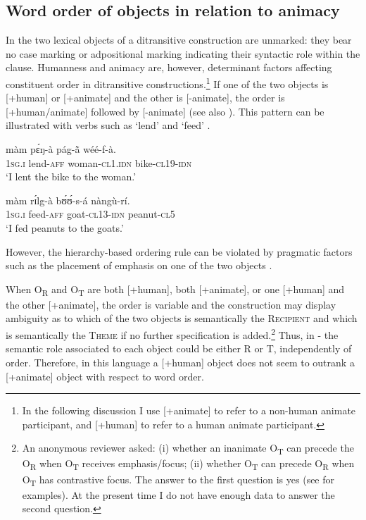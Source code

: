 \documentclass[output=paper]{langsci/langscibook}
\begin{document}
\subsection{Word order of objects in relation to animacy}\label{§4.2:word.pacchiarotti}

In  the two lexical objects of a ditransitive construction are unmarked: they bear no case marking or adpositional marking indicating their syntactic role within the clause. Humanness and animacy are, however, determinant factors affecting constituent order in ditransitive constructions.\footnote{In the following discussion I use [+animate] to refer to a non-human animate participant, and [+human] to refer to a human animate participant.} If one of the two objects is [+human] or [+animate] and the other is [-animate], the order is [+human/animate] followed by [-animate] (see also \citealt[394]{canu1974}). This pattern can be illustrated with verbs such as `lend'  and `feed' .

\ea
\label{ex:14.pacchiarotti}
\gll màm    pɛ́ŋ-à         pág-\`{ã}      wéé-f-à.\\
\textsc{1sg.i}    lend-\textsc{aff}        woman-\textsc{cl1.idn}  bike-\textsc{cl19-idn}\\
\glt `I lent the bike to the woman.'
\z

\ea
\label{ex:15.pacchiarotti}
\gll màm    rɪ́lg-à      bʊ́ʊ́-s-á    nàngù-rí. \\
\textsc{1sg.i}    feed-\textsc{aff}    goat-\textsc{cl13-idn}  peanut-\textsc{cl5}\\
\glt `I fed peanuts to the goats.'
\z

However, the hierarchy-based ordering rule can be violated by pragmatic factors such as the placement of emphasis on one of the two objects \citep[375]{kabore1985}.

When O\textsubscript{R} and O\textsubscript{T} are both [+human], both [+animate], or one [+human] and the other [+animate],  the order is variable and the construction may display ambiguity as to which of the two objects is semantically the \textsc{Recipient} and which is semantically the \textsc{Theme} if no further specification is added.\footnote{An anonymous reviewer asked: (i) whether an inanimate O\textsubscript{T} can precede the O\textsubscript{R} when O\textsubscript{T} receives emphasis/focus; (ii) whether O\textsubscript{T} can precede O\textsubscript{R} when O\textsubscript{T} has contrastive focus. The answer to the first question is yes (see \citealt[375]{kabore1985} for examples). At the present time I do not have enough data to answer the second question.} Thus, in - the semantic role associated to each object could be either R or T, independently of order. Therefore, in this language a [+human] object does not seem to outrank a [+animate] object with respect to word order.
\end{document}
